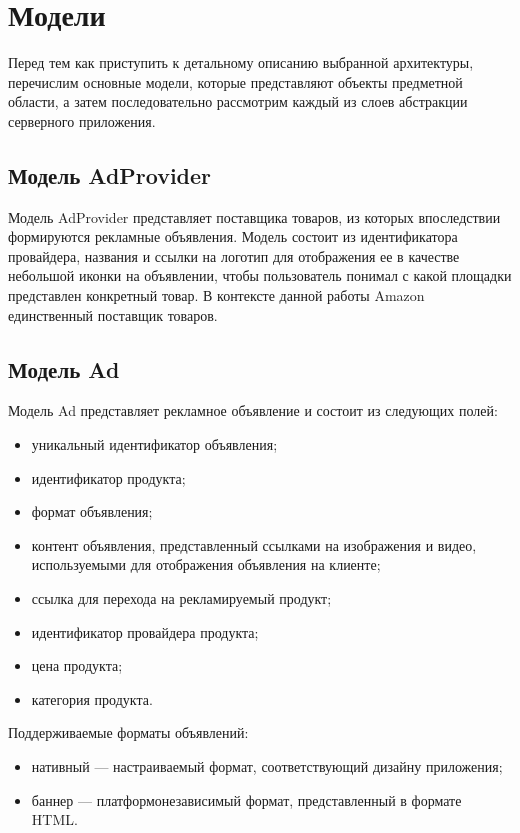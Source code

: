 \documentclass[specification,annotation,times]{itmo-student-thesis}
\begin{document}
\section{Модели}\label{sec:models}

Перед тем как приступить к детальному описанию выбранной архитектуры, перечислим основные модели, которые представляют объекты предметной области, а затем последовательно рассмотрим каждый из слоев абстракции серверного приложения. 

\subsection{Модель AdProvider}

 Модель AdProvider представляет поставщика товаров, из которых впоследствии формируются рекламные объявления. Модель состоит из идентификатора провайдера, названия и ссылки на логотип для отображения ее в качестве небольшой иконки на объявлении, чтобы пользователь понимал с какой площадки представлен конкретный товар. В контексте данной работы Amazon единственный поставщик товаров.

\subsection{Модель Ad}

Модель Ad представляет рекламное объявление и состоит из следующих полей:
\begin{itemize}
\item уникальный идентификатор объявления;
\item идентификатор продукта;
\item формат объявления;
\item контент объявления, представленный ссылками на изображения и видео, используемыми для отображения объявления на клиенте;
\item ссылка для перехода на рекламируемый продукт;
\item идентификатор провайдера продукта;
\item цена продукта;
\item категория продукта.
\end{itemize}

Поддерживаемые форматы объявлений: 
\begin{itemize}
\item нативный — настраиваемый формат, соответствующий дизайну приложения;
\item баннер — платформонезависимый формат, представленный в формате HTML.
\end{itemize}
\end{document}
